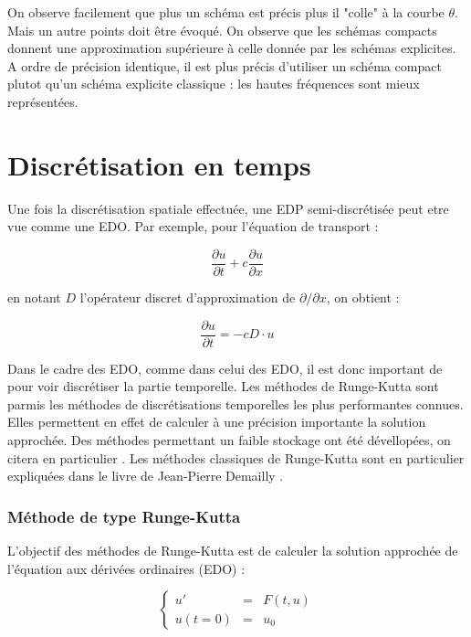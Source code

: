 \documentclass[10pt,a4paper]{amsart}
\begin{document}
On observe facilement que plus un schéma est précis plus il "colle" à la courbe $\theta$. Mais un autre points doit être évoqué. On observe que les schémas compacts donnent une approximation supérieure à celle donnée par les schémas explicites. A ordre de précision identique, il est plus précis d'utiliser un schéma compact plutot qu'un schéma explicite classique : les hautes fréquences sont mieux représentées.


%
%

\part{Discrétisation en temps}

Une fois la discrétisation spatiale effectuée, une EDP semi-discrétisée peut etre vue comme une EDO. Par exemple, pour l'équation de transport :

$$\dfrac{\partial u}{\partial t} + c \dfrac{\partial u}{\partial x}$$

en notant $D$ l'opérateur discret d'approximation de $\partial / \partial x$, on obtient :

$$\dfrac{\partial u}{\partial t} = -c D \cdot u$$

Dans le cadre des EDO, comme dans celui des EDO, il est donc important de pour voir discrétiser la partie temporelle. Les méthodes de Runge-Kutta sont parmis les méthodes de discrétisations temporelles les plus performantes connues. Elles permettent en effet de calculer à une précision importante la solution approchée. Des méthodes permettant un faible stockage ont été dévellopées, on citera en particulier \cite{Kennedy Carpenter Lewis}. Les méthodes classiques de Runge-Kutta sont en particulier expliquées dans le livre de Jean-Pierre Demailly \cite{Demailly}.

\section{Méthode de type Runge-Kutta}

L'objectif des méthodes de Runge-Kutta est de calculer la solution approchée de l'équation aux dérivées ordinaires (EDO) :

\begin{equation}\label{EDO}
\left\{
\begin{array}{rcl}
u' & = & F(t,u)\\
u(t=0) & = & u_0
\end{array}
\right.
\end{equation}
\end{document}

